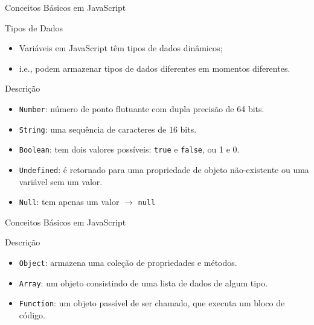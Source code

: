 \documentclass[xcolor=dvipsnames,table]{beamer}
\begin{document}
\begin{frame}[fragile]{Conceitos Básicos em JavaScript}
	\begin{block}{Tipos de Dados}
		\begin{itemize}
			\item Variáveis em JavaScript têm tipos de dados dinâmicos; \pause
			\item i.e., podem armazenar tipos de dados diferentes em momentos diferentes.
		\end{itemize}
	\end{block} \pause
	\begin{block}{Descrição}
		\begin{itemize}
			\item {\tt Number}: número de ponto flutuante com dupla precisão de 64 bits. \pause
			\item {\tt String}: uma sequência de caracteres de 16 bits. \pause
			\item {\tt Boolean}: tem dois valores possíveis: {\tt true} e {\tt false}, ou 1 e 0. \pause
			\item {\tt Undefined}: é retornado para uma propriedade de objeto não-existente ou uma variável sem um valor. \pause
			\item {\tt Null}: tem apenas um valor $\rightarrow$ {\tt null}
		\end{itemize}	
	\end{block}
\end{frame}


\begin{frame}[fragile]{Conceitos Básicos em JavaScript}
	\begin{block}{Descrição}
		\begin{itemize}
			\item {\tt Object}: armazena uma coleção de propriedades e métodos. \pause
			\item {\tt Array}: um objeto consistindo de uma lista de dados de algum tipo. \pause 
			\item {\tt Function}: um objeto passível de ser chamado, que executa um bloco de código. 
		\end{itemize}	
	\end{block}
\end{frame}
\end{document}
